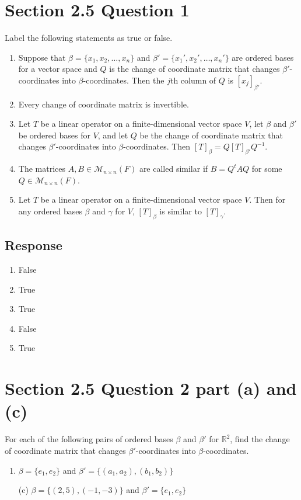 \documentclass[13pt]{article}
\begin{document}
        \section*{Section 2.5 Question 1}
        Label the following statements as true or false.
        \begin{enumerate}[label=(\alph*),leftmargin=*]
        \item Suppose that $\beta = \{ x_1, x_2, \ldots, x_n \}$ and $\beta' = \{ {x_1}', {x_2}', \ldots, {x_n}' \}$ are ordered bases for a vector space and $Q$ is the change of coordinate matrix that changes $\beta'$-coordinates into $\beta$-coordinates. Then the $j$th column of $Q$ is $[x_j]_{\beta'}$.
        \item Every change of coordinate matrix is invertible.
        \item Let $T$ be a linear operator on a finite-dimensional vector space $V$, let $\beta$ and $\beta'$ be ordered bases for $V$, and let $Q$ be the change of coordinate matrix that changes $\beta'$-coordinates into $\beta$-coordinates. Then $[T]_\beta = Q[T]_{\beta'}Q^{-1}$.
        \item The matrices $A, B \in \mathcal{M}_{n \times n}(F)$ are called similar if $B = Q^tAQ$ for some $Q \in \mathcal{M}_{n \times n}(F)$.
        \item Let $T$ be a linear operator on a finite-dimensional vector space $V$. Then for any ordered bases $\beta$ and $\gamma$ for $V$, $[T]_\beta$ is similar to $[T]_\gamma$.
        \end{enumerate}
        \subsection*{Response}
        \begin{enumerate}[label=(\alph*),leftmargin=*]
        \item False
        \item True
        \item True
        \item False
        \item True
        \end{enumerate}

        \newpage
        \section*{Section 2.5 Question 2 part (a) and (c)}
        For each of the following pairs of ordered bases $\beta$ and $\beta'$ for $\mathbb{R}^2$, find the change of coordinate matrix that changes $\beta'$-coordinates into $\beta$-coordinates.
        \begin{enumerate}[label=(\alph*),leftmargin=*]
        \item $\beta = \{ e_1, e_2 \}$ and $\beta' = \{ (a_1, a_2), (b_1, b_2) \}$
        \item [(c)] $\beta = \{ (2, 5), (-1, -3) \}$ and $\beta' = \{ e_1, e_2 \}$
        \end{enumerate}
\end{document}
